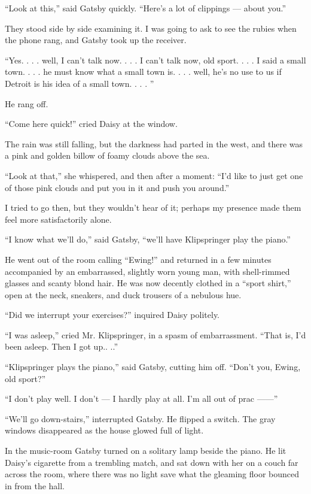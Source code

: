 \documentclass{znotebook}
\begin{document}
``Look at this,'' said Gatsby quickly. ``Here’s a lot of clippings — about you.''

They stood side by side examining it. I was going to ask to see the rubies when the phone rang, and Gatsby took up the receiver.

``Yes. . . . well, I can’t talk now. . . . I can’t talk now, old sport. . . . I said a small town. . . . he must know what a small town is. . . . well, he’s no use to us if Detroit is his idea of a small town. . . . ''

He rang off.

``Come here quick!'' cried Daisy at the window.

The rain was still falling, but the darkness had parted in the west, and there was a pink and golden billow of foamy clouds above the sea.

``Look at that,'' she whispered, and then after a moment: ``I’d like to just get one of those pink clouds and put you in it and push you around.''

I tried to go then, but they wouldn’t hear of it; perhaps my presence made them feel more satisfactorily alone.

``I know what we’ll do,'' said Gatsby, ``we’ll have Klipspringer play the piano.''

He went out of the room calling ``Ewing!'' and returned in a few minutes accompanied by an embarrassed, slightly worn young man, with shell-rimmed glasses and scanty blond hair. He was now decently clothed in a ``sport shirt,'' open at the neck, sneakers, and duck trousers of a nebulous hue.

``Did we interrupt your exercises?'' inquired Daisy politely.

``I was asleep,'' cried Mr. Klipspringer, in a spasm of embarrassment. ``That is, I’d been asleep. Then I got up.. ..''

``Klipspringer plays the piano,'' said Gatsby, cutting him off. ``Don’t you, Ewing, old sport?''

``I don’t play well. I don’t — I hardly play at all. I’m all out of prac ——''

``We’ll go down-stairs,'' interrupted Gatsby. He flipped a switch. The gray windows disappeared as the house glowed full of light.

In the music-room Gatsby turned on a solitary lamp beside the piano. He lit Daisy’s cigarette from a trembling match, and sat down with her on a couch far across the room, where there was no light save what the gleaming floor bounced in from the hall.
\end{document}
